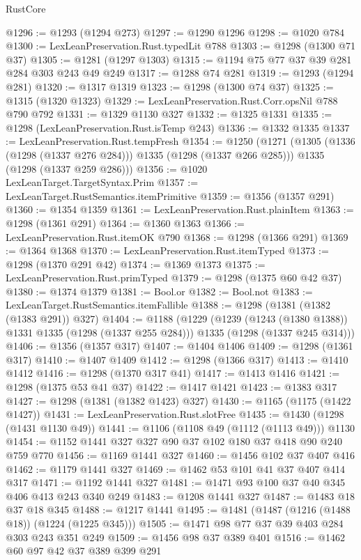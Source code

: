 \begin{lexlean}{RustCore}
\begin{coremodule}
@1296 := @1293 (@1294 @273)
@1297 := @1290 @1296
@1298 := @1020 @784
@1300 := LexLeanPreservation.Rust.typedLit @788
@1303 := @1298 (@1300 @71 @37)
@1305 := @1281 (@1297 @1303)
@1315 := @1194 @75 @77 @37 @39 @281 @284 @303 @243 @49 @249
@1317 := @1288 @74 @281
@1319 := @1293 (@1294 @281)
@1320 := @1317 @1319
@1323 := @1298 (@1300 @74 @37)
@1325 := @1315 (@1320 @1323)
@1329 := LexLeanPreservation.Rust.Corr.opsNil @788 @790 @792
@1331 := @1329 @1130 @327
@1332 := @1325 @1331
@1335 := @1298 (LexLeanPreservation.Rust.isTemp @243)
@1336 := @1332 @1335
@1337 := LexLeanPreservation.Rust.tempFresh
@1354 := @1250
    (@1271
      (@1305 (@1336 (@1298 (@1337 @276 @284))) @1335 (@1298 (@1337 @266 @285)))
      @1335
      (@1298 (@1337 @259 @286)))
@1356 := @1020 LexLeanTarget.TargetSyntax.Prim
@1357 := LexLeanTarget.RustSemantics.itemPrimitive
@1359 := @1356 (@1357 @291)
@1360 := @1354 @1359
@1361 := LexLeanPreservation.Rust.plainItem
@1363 := @1298 (@1361 @291)
@1364 := @1360 @1363
@1366 := LexLeanPreservation.Rust.itemOK @790
@1368 := @1298 (@1366 @291)
@1369 := @1364 @1368
@1370 := LexLeanPreservation.Rust.itemTyped
@1373 := @1298 (@1370 @291 @42)
@1374 := @1369 @1373
@1375 := LexLeanPreservation.Rust.primTyped
@1379 := @1298 (@1375 @60 @42 @37)
@1380 := @1374 @1379
@1381 := Bool.or
@1382 := Bool.not
@1383 := LexLeanTarget.RustSemantics.itemFallible
@1388 := @1298 (@1381 (@1382 (@1383 @291)) @327)
@1404 := @1188
    (@1229
      (@1239 (@1243 (@1380 @1388)) @1331 @1335 (@1298 (@1337 @255 @284)))
      @1335
      (@1298 (@1337 @245 @314)))
@1406 := @1356 (@1357 @317)
@1407 := @1404 @1406
@1409 := @1298 (@1361 @317)
@1410 := @1407 @1409
@1412 := @1298 (@1366 @317)
@1413 := @1410 @1412
@1416 := @1298 (@1370 @317 @41)
@1417 := @1413 @1416
@1421 := @1298 (@1375 @53 @41 @37)
@1422 := @1417 @1421
@1423 := @1383 @317
@1427 := @1298 (@1381 (@1382 @1423) @327)
@1430 := @1165 (@1175 (@1422 @1427))
@1431 := LexLeanPreservation.Rust.slotFree
@1435 := @1430 (@1298 (@1431 @1130 @49))
@1441 := @1106 (@1108 @49 (@1112 (@1113 @49))) @1130
@1454 := @1152 @1441 @327 @327 @90 @37 @102 @180 @37 @418 @90 @240 @759 @770
@1456 := @1169 @1441 @327
@1460 := @1456 @102 @37 @407 @416
@1462 := @1179 @1441 @327
@1469 := @1462 @53 @101 @41 @37 @407 @414 @317
@1471 := @1192 @1441 @327
@1481 := @1471 @93 @100 @37 @40 @345 @406 @413 @243 @340 @249
@1483 := @1208 @1441 @327
@1487 := @1483 @18 @37 @18 @345
@1488 := @1217 @1441
@1495 := @1481 (@1487 (@1216 (@1488 @18)) (@1224 (@1225 @345)))
@1505 := @1471 @98 @77 @37 @39 @403 @284 @303 @243 @351 @249
@1509 := @1456 @98 @37 @389 @401
@1516 := @1462 @60 @97 @42 @37 @389 @399 @291

\end{coremodule}
\end{lexlean}
